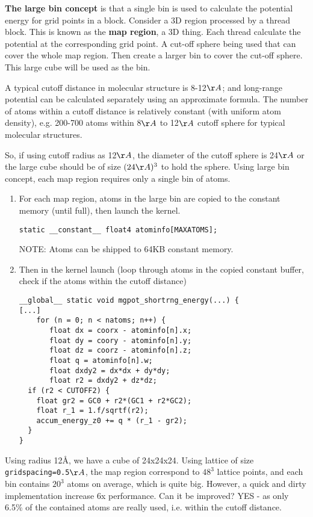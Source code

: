 {\bf The large bin concept} is that a single bin is used to calculate
the potential energy for grid points in a block.  Consider a 3D region
processed by a thread block. This is known as the {\bf map region}, a
3D thing. Each thread calculate the potential at the corresponding
grid point. A cut-off sphere being used that can cover the whole map
region. Then create a larger bin to cover the cut-off sphere. This
large cube will be used as the bin. 

\begin{framed}
  A typical cutoff distance in molecular structure is 8-12$\AA$; and
  long-range potential can be calculated separately using an
  approximate formula.  The number of atoms within a cutoff distance
  is relatively constant (with uniform atom density), e.g. 200-700
  atoms within 8$\AA$ to 12$\AA$ cutoff sphere for typical molecular
  structures.
\end{framed}

So, if using cutoff radius as 12$\AA$, the diameter of the cutoff
sphere is 24$\AA$ or the large cube should be of size $(24\AA)^3$ to
hold the sphere. Using large bin concept, each map region requires
only a single bin of atoms. 
\begin{enumerate}
\item For each map region, atoms in the large bin are copied to the
  constant memory (until full), then launch the kernel.

\begin{lstlisting}
static __constant__ float4 atominfo[MAXATOMS];
\end{lstlisting}

  NOTE: Atoms can be shipped to 64KB constant memory.


\item Then in the kernel launch (loop through atoms in the copied
  constant buffer, check if the atoms within the cutoff distance)
\begin{lstlisting}
__global__ static void mgpot_shortrng_energy(...) {
[...]
    for (n = 0; n < natoms; n++) {
       float dx = coorx - atominfo[n].x;
       float dy = coory - atominfo[n].y;
       float dz = coorz - atominfo[n].z;
       float q = atominfo[n].w;
       float dxdy2 = dx*dx + dy*dy;
       float r2 = dxdy2 + dz*dz;
  if (r2 < CUTOFF2) {
    float gr2 = GC0 + r2*(GC1 + r2*GC2);
    float r_1 = 1.f/sqrtf(r2);
    accum_energy_z0 += q * (r_1 - gr2);
  }
}
\end{lstlisting}

\end{enumerate}
Using radius 12\AA, we have a cube of 24x24x24. Using lattice of size
\verb!gridspacing=0.5!$\AA$, the map region correspond to $48^3$
lattice points, and each bin contains $20^3$ atoms on average, which
is quite big. However, a quick and dirty implementation increase 6x
performance.  Can it be improved? YES - as only 6.5\% of the contained
atoms are really used, i.e. within the cutoff distance.

